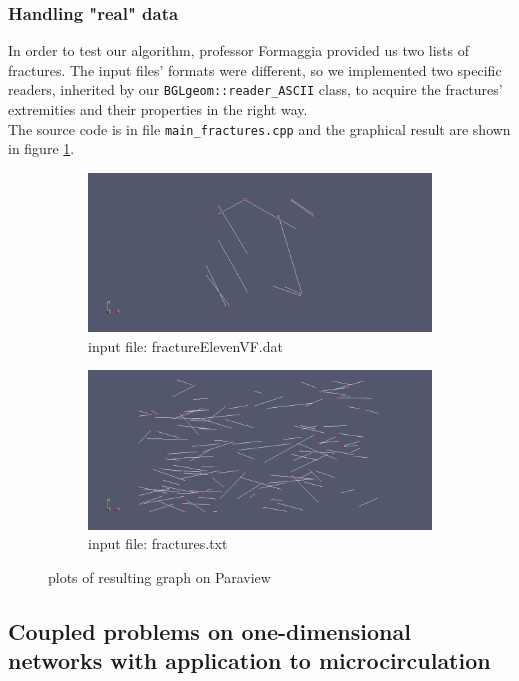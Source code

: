 \documentclass[10pt]{article} %
\begin{document}
	\subsubsection{Handling "real" data}
	In order to test our algorithm, professor Formaggia provided us two lists of fractures. The input files' formats were different, so we implemented two specific readers, inherited by our \texttt{BGLgeom::reader\_ASCII} class, to acquire the fractures' extremities and their properties in the right way. \\
	The source code is in file \texttt{main\_fractures.cpp} and the graphical result are shown in figure \ref{fig:plots_real_fractures}.
	\begin{figure}
		\centering
		\begin{subfigure}{.5\textwidth}
			\centering
			\includegraphics[width=.9\linewidth]{graph1}
  			\caption*{input file: fractureElevenVF.dat}
		\end{subfigure}%
		\begin{subfigure}{.5\textwidth}
			\centering
			\includegraphics[width=.9\linewidth]{graph2}
			\caption*{input file: fractures.txt}
		\end{subfigure}
		\caption{plots of resulting graph on Paraview}
		\label{fig:plots_real_fractures}
	\end{figure}
	
	\subsection{Coupled problems on one-dimensional networks with application to microcirculation}
	
\end{document}
